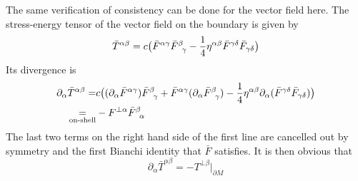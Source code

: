 \begin{remark}
The same verification of consistency can be done for the vector field here.  
The stress-energy tensor of the vector field on the boundary is given by
\begin{equation*}
\bar{T}^{\alpha\beta} = c\big( \bar{F}^{\alpha\gamma}\bar{F}^{\beta}_{\enskip\gamma}
- \frac 1 4 \eta^{\alpha\beta}\bar{F}^{\gamma\delta}\bar{F}_{\gamma\delta} \big)
\end{equation*}
Its divergence is 
\begin{equation*}
\begin{split}
\partial_\alpha \bar{T}^{\alpha\beta} = & c\big(
(\partial_\alpha \bar{F}^{\alpha\gamma})\bar{F}^{\beta}_{\enskip\gamma} +
\bar{F}^{\alpha\gamma}(\partial_\alpha\bar{F}^{\beta}_{\enskip\gamma})
- \frac 1 4 \eta^{\alpha\beta}\partial_\alpha(\bar{F}^{\gamma\delta}\bar{F}_{\gamma\delta}) \big)\\
\underset{\textrm{on-shell}}= & 
- F^{\bot\alpha}\bar{F}^\beta_{\enskip\alpha}
\end{split}
\end{equation*}
The last two terms on the right hand side of the first line are cancelled out by symmetry and the first Bianchi identity that $\bar{F}$ satisfies.
It is then obvious that
\begin{equation*}
\partial_\alpha \bar{T}^{\alpha\beta} = -T^{\bot\beta}\vert_{\partial M}
\end{equation*}
\end{remark}
